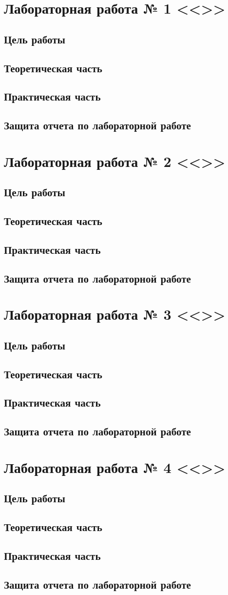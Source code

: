 		\newcommand{\labplan}[2]
		{
			\section{Лабораторная работа № #1 <<#2>>}

				\subsection{Цель работы}

					

				\subsection{Теоретическая часть}

					

				\subsection{Практическая часть}

					

				\subsection{Защита отчета по лабораторной работе}

					
		}

		\labplan{1}{\tfirst}
		\labplan{2}{\tsecond}
		\labplan{3}{\tthird}
		\labplan{4}{\tfourth}


\backmatter

	

	\appendix
	







